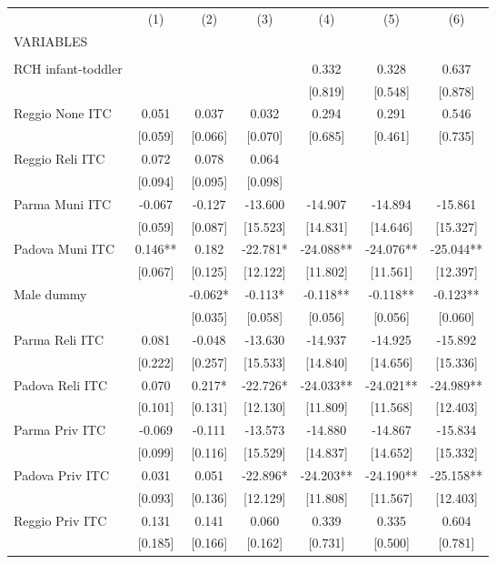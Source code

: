 \begin{tabular}{lcccccc} \hline
 & (1) & (2) & (3) & (4) & (5) & (6) \\
VARIABLES &  &  &  &  &  &  \\ \hline
 &  &  &  &  &  &  \\
RCH infant-toddler &  &  &  & 0.332 & 0.328 & 0.637 \\
 &  &  &  & [0.819] & [0.548] & [0.878] \\
Reggio None ITC & 0.051 & 0.037 & 0.032 & 0.294 & 0.291 & 0.546 \\
 & [0.059] & [0.066] & [0.070] & [0.685] & [0.461] & [0.735] \\
Reggio Reli ITC & 0.072 & 0.078 & 0.064 &  &  &  \\
 & [0.094] & [0.095] & [0.098] &  &  &  \\
Parma Muni ITC & -0.067 & -0.127 & -13.600 & -14.907 & -14.894 & -15.861 \\
 & [0.059] & [0.087] & [15.523] & [14.831] & [14.646] & [15.327] \\
Padova Muni ITC & 0.146** & 0.182 & -22.781* & -24.088** & -24.076** & -25.044** \\
 & [0.067] & [0.125] & [12.122] & [11.802] & [11.561] & [12.397] \\
Male dummy &  & -0.062* & -0.113* & -0.118** & -0.118** & -0.123** \\
 &  & [0.035] & [0.058] & [0.056] & [0.056] & [0.060] \\
Parma Reli ITC & 0.081 & -0.048 & -13.630 & -14.937 & -14.925 & -15.892 \\
 & [0.222] & [0.257] & [15.533] & [14.840] & [14.656] & [15.336] \\
Padova Reli ITC & 0.070 & 0.217* & -22.726* & -24.033** & -24.021** & -24.989** \\
 & [0.101] & [0.131] & [12.130] & [11.809] & [11.568] & [12.403] \\
Parma Priv ITC & -0.069 & -0.111 & -13.573 & -14.880 & -14.867 & -15.834 \\
 & [0.099] & [0.116] & [15.529] & [14.837] & [14.652] & [15.332] \\
Padova Priv ITC & 0.031 & 0.051 & -22.896* & -24.203** & -24.190** & -25.158** \\
 & [0.093] & [0.136] & [12.129] & [11.808] & [11.567] & [12.403] \\
Reggio Priv ITC & 0.131 & 0.141 & 0.060 & 0.339 & 0.335 & 0.604 \\
 & [0.185] & [0.166] & [0.162] & [0.731] & [0.500] & [0.781] \\

\end{tabular}
